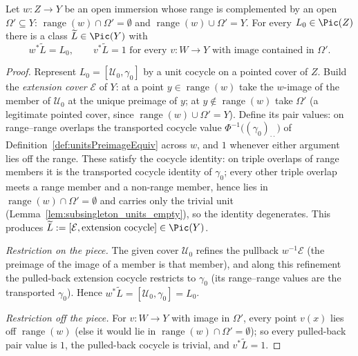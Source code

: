 \begin{theorem}
  \label{thm:cechPic_extendClass}
  \leanok
  Let \(w \colon Z \to Y\) be an open immersion whose range is complemented by an open
  \(\Omega' \subseteq Y\): \(\operatorname{range}(w) \cap \Omega' = \emptyset\) and
  \(\operatorname{range}(w) \cup \Omega' = Y\). For every \(L_0 \in \Pic(Z)\) there is a class
  \(\widetilde L \in \Pic(Y)\) with
  \[
    w^{*}\widetilde L = L_0, \qquad v^{*}\widetilde L = 1 \text{ for every } v \colon W \to Y
    \text{ with image contained in } \Omega'.
  \]
\end{theorem}
\begin{proof}
  \leanok
  Represent \(L_0 = [\mathcal U_0, \gamma_0]\) by a unit cocycle on a pointed cover of \(Z\). Build
  the \emph{extension cover} \(\mathcal E\) of \(Y\): at a point \(y \in \operatorname{range}(w)\)
  take the \(w\)-image of the member of \(\mathcal U_0\) at the unique preimage of \(y\); at
  \(y \notin \operatorname{range}(w)\) take \(\Omega'\) (a legitimate pointed cover, since
  \(\operatorname{range}(w) \cup \Omega' = Y\)). Define its pair values: on range--range overlaps
  the transported cocycle value \(\Phi^{-1}\bigl((\gamma_0)_{\cdot\cdot}\bigr)\) of
  Definition~\ref{def:unitsPreimageEquiv} across \(w\), and \(1\) whenever either argument lies off
  the range. These satisfy the cocycle identity: on triple overlaps of range members it is the
  transported cocycle identity of \(\gamma_0\); every other triple overlap meets a range member and
  a non-range member, hence lies in \(\operatorname{range}(w) \cap \Omega' = \emptyset\) and carries
  only the trivial unit (Lemma~\ref{lem:subsingleton_units_empty}), so the identity degenerates.
  This produces \(\widetilde L := [\mathcal E, \text{extension cocycle}] \in \Pic(Y)\).

  \emph{Restriction on the piece.} The given cover \(\mathcal U_0\) refines the pullback
  \(w^{-1}\mathcal E\) (the preimage of the image of a member is that member), and along this
  refinement the pulled-back extension cocycle restricts to \(\gamma_0\) (its range--range values
  are the transported \(\gamma_0\)). Hence \(w^{*}\widetilde L = [\mathcal U_0, \gamma_0] = L_0\).

  \emph{Restriction off the piece.} For \(v \colon W \to Y\) with image in \(\Omega'\), every point
  \(v(x)\) lies off \(\operatorname{range}(w)\) (else it would lie in
  \(\operatorname{range}(w) \cap \Omega' = \emptyset\)); so every pulled-back pair value is \(1\),
  the pulled-back cocycle is trivial, and \(v^{*}\widetilde L = 1\).
\end{proof}

